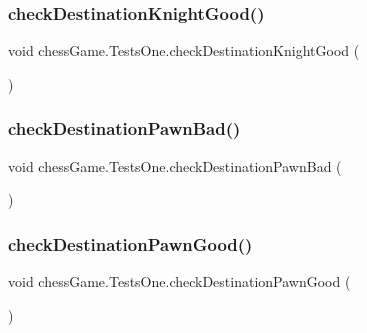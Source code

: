 \hypertarget{classchess_game_1_1_tests_one_a433f857badf4ba90f5689af141834f2a}{}\label{classchess_game_1_1_tests_one_a433f857badf4ba90f5689af141834f2a} 
\subsubsection{\texorpdfstring{check\+Destination\+Knight\+Good()}{checkDestinationKnightGood()}}
{\footnotesize\ttfamily void chess\+Game.\+Tests\+One.\+check\+Destination\+Knight\+Good (\begin{DoxyParamCaption}{ }\end{DoxyParamCaption})}

\hypertarget{classchess_game_1_1_tests_one_a5574aa9835757dbe5a9475e6dc299363}{}\label{classchess_game_1_1_tests_one_a5574aa9835757dbe5a9475e6dc299363} 
\subsubsection{\texorpdfstring{check\+Destination\+Pawn\+Bad()}{checkDestinationPawnBad()}}
{\footnotesize\ttfamily void chess\+Game.\+Tests\+One.\+check\+Destination\+Pawn\+Bad (\begin{DoxyParamCaption}{ }\end{DoxyParamCaption})}

\hypertarget{classchess_game_1_1_tests_one_a761a9c74c24b69d572b83dc985ac0983}{}\label{classchess_game_1_1_tests_one_a761a9c74c24b69d572b83dc985ac0983} 
\subsubsection{\texorpdfstring{check\+Destination\+Pawn\+Good()}{checkDestinationPawnGood()}}
{\footnotesize\ttfamily void chess\+Game.\+Tests\+One.\+check\+Destination\+Pawn\+Good (\begin{DoxyParamCaption}{ }\end{DoxyParamCaption})}

